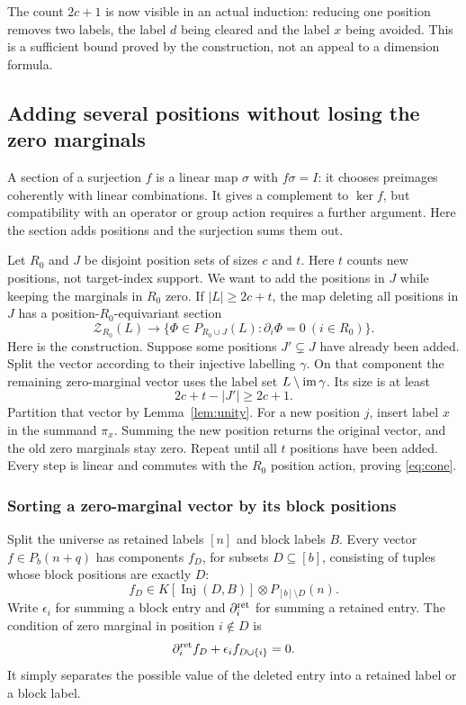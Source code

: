 \documentclass[11pt,a4paper]{article}
\theoremstyle{definition}\newtheorem{definition}[theorem]{Definition}
\theoremstyle{remark}\newtheorem{remark}[theorem]{Remark}
\DeclareMathOperator{\Inj}{Inj}
\begin{document}
The count $2c+1$ is now visible in an actual induction: reducing one position removes two labels, the label $d$ being cleared and the label $x$ being avoided. This is a sufficient bound proved by the construction, not an appeal to a dimension formula.

\subsection{Adding several positions without losing the zero marginals}\label{sec:cone}
A section of a surjection $f$ is a linear map $\sigma$ with
$f\sigma=I$: it chooses preimages coherently with linear combinations.
It gives a complement to $\ker f$, but compatibility with an operator
or group action requires a further argument. Here the section adds
positions and the surjection sums them out.

Let $R_0$ and $J$ be disjoint position sets of sizes $c$ and $t$. Here $t$ counts new positions, not target-index support. We want to add the positions in $J$ while keeping the marginals in $R_0$ zero. If $|L|\ge2c+t$, the map deleting all positions in $J$ has a position-$R_0$-equivariant section
\begin{equation}\label{eq:cone}
\mathcal Z_{R_0}(L)\longrightarrow
\{\Phi\in P_{R_0\cup J}(L):\partial_i\Phi=0\ (i\in R_0)\}.
\end{equation}
Here is the construction. Suppose some positions $J'\subsetneq J$ have already been added. Split the vector according to their injective labelling $\gamma$. On that component the remaining zero-marginal vector uses the label set $L\setminus\operatorname{im}\gamma$. Its size is at least
\[2c+t-|J'|\ge2c+1.
\]
Partition that vector by Lemma~\ref{lem:unity}. For a new position $j$, insert label $x$ in the summand $\pi_x$. Summing the new position returns the original vector, and the old zero marginals stay zero. Repeat until all $t$ positions have been added. Every step is linear and commutes with the $R_0$ position action, proving \eqref{eq:cone}.

\subsubsection{Sorting a zero-marginal vector by its block positions}
Split the universe as retained labels $[n]$ and block labels $B$. Every vector $f\in P_b(n+q)$ has components $f_D$, for subsets $D\subseteq[b]$, consisting of tuples whose block positions are exactly $D$:
\[f_D\in K[\Inj(D,B)]\otimes P_{[b]\setminus D}(n).
\]
Write $\epsilon_i$ for summing a block entry and $\partial_i^{\rm ret}$ for summing a retained entry. The condition of zero marginal in position $i\notin D$ is
\begin{equation}\label{eq:cycleeq}
\partial_i^{\rm ret}f_D+\epsilon_i f_{D\cup\{i\}}=0.
\end{equation}
It simply separates the possible value of the deleted entry into a retained label or a block label.
\end{document}
